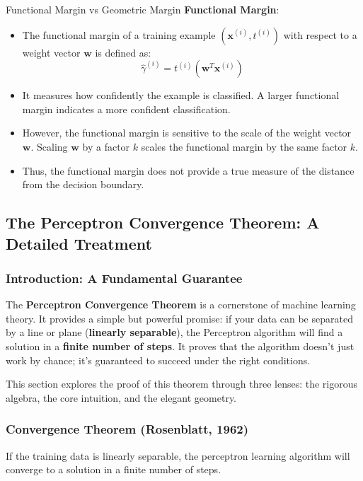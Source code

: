 \begin{fundasblock}{Functional Margin vs Geometric Margin}
\textbf{Functional Margin}:
\begin{itemize}
    \item The functional margin of a training example \((\mathbf{x}^{(i)}, t^{(i)})\) with respect to a weight vector \(\mathbf{w}\) is defined as:
    \[\hat{\gamma}^{(i)} = t^{(i)} (\mathbf{w}^T \mathbf{x}^{(i)})\]
    \item It measures how confidently the example is classified. A larger functional margin indicates a more confident classification.
    \item However, the functional margin is sensitive to the scale of the weight vector \(\mathbf{w}\). Scaling \(\mathbf{w}\) by a factor \(k\) scales the functional margin by the same factor \(k\).
    \item Thus, the functional margin does not provide a true measure of the distance from the decision boundary.
\end{itemize}
\end{fundasblock}



\subsection{The Perceptron Convergence Theorem: A Detailed Treatment}

\subsubsection{Introduction: A Fundamental Guarantee}

The \textbf{Perceptron Convergence Theorem} is a cornerstone of machine learning theory. It provides a simple but powerful promise: if your data can be separated by a line or plane (\textbf{linearly separable}), the Perceptron algorithm will find a solution in a \textbf{finite number of steps}. It proves that the algorithm doesn't just work by chance; it's guaranteed to succeed under the right conditions.

This section explores the proof of this theorem through three lenses: the rigorous algebra, the core intuition, and the elegant geometry.

\subsubsection{Convergence Theorem (Rosenblatt, 1962)}
\begin{theorem}
If the training data is linearly separable, the perceptron learning algorithm will converge to a solution in a finite number of steps.
\end{theorem}

